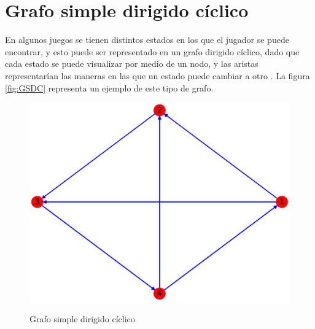 \documentclass{article}
\begin{document}
\section{Grafo simple dirigido cíclico}
En algunos juegos se tienen distintos estados en los que el jugador se puede encontrar, y esto puede ser representado en un grafo dirigido cíclico, dado que cada estado se puede visualizar por medio de un nodo, y las aristas representarían las maneras en las que un estado puede cambiar a otro \cite{GSDA}. La figura \ref{fig:GSDC} representa un ejemplo de este tipo de grafo.
\begin{figure}[h!]
    \caption{Grafo simple dirigido cíclico}
    \includegraphics[width=\textwidth]{5-GSDC}
    \label{fig:GSNDA}
\end{figure}



\end{document}
